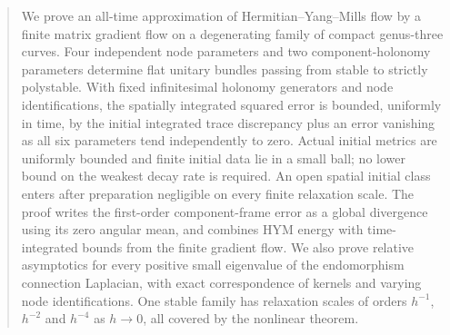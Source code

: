 

\begin{abstract}
We prove an all-time approximation of Hermitian--Yang--Mills flow by a
finite matrix gradient flow on a degenerating family of compact genus-three
curves. Four independent node parameters and two component-holonomy
parameters determine flat unitary bundles passing from stable to strictly
polystable. With fixed infinitesimal holonomy generators and node
identifications, the spatially integrated squared error is bounded,
uniformly in time, by the initial integrated trace discrepancy plus an
error vanishing as all six parameters tend independently to zero.
Actual initial metrics are uniformly bounded and finite initial data lie
in a small ball; no lower bound on the weakest decay rate is required.
An open spatial initial class enters after preparation negligible on every
finite relaxation scale. The proof writes the first-order component-frame
error as a global divergence using its zero angular mean, and combines
HYM energy with time-integrated bounds from the finite gradient flow.
We also prove relative asymptotics for every positive small eigenvalue of
the endomorphism connection Laplacian, with exact correspondence of kernels
and varying node identifications. One stable family has relaxation scales
of orders $h^{-1}$, $h^{-2}$ and $h^{-4}$ as $h\to0$, all covered by
the nonlinear theorem.
\end{abstract}
\maketitle











